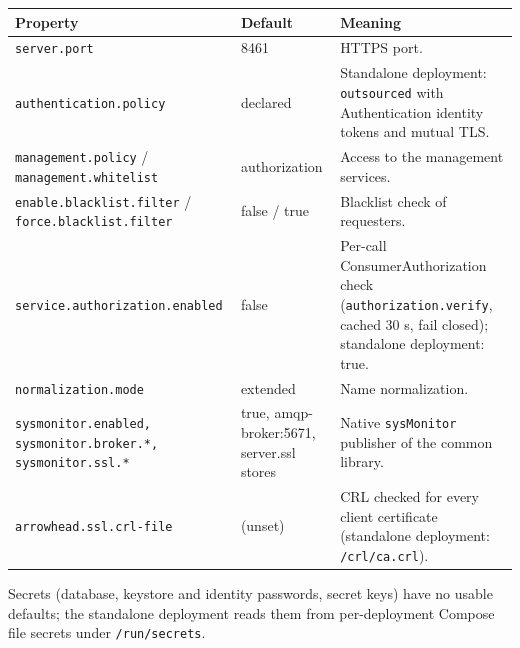 \documentclass[a4paper]{arrowhead}
\begin{document}
\noindent\begin{longtable}{| p{5.4cm} | p{3.4cm} | p{6.4cm} |} \hline
\rowcolor{gray!33} Property & Default & Meaning \\ \hline \endhead
\texttt{server.\allowbreak{}port} & 8461 & HTTPS port. \\ \hline
\texttt{authentication.\allowbreak{}policy} & declared & Standalone deployment: \texttt{outsourced} with Authentication identity tokens and mutual TLS. \\ \hline
\texttt{management.\allowbreak{}policy} / \texttt{management.\allowbreak{}whitelist} & authorization & Access to the management services. \\ \hline
\texttt{enable.\allowbreak{}blacklist.\allowbreak{}filter} / \texttt{force.\allowbreak{}blacklist.\allowbreak{}filter} & false / true & Blacklist check of requesters. \\ \hline
\texttt{service.\allowbreak{}authorization.\allowbreak{}enabled} & false & Per-call Consumer\allowbreak{}Authorization check (\texttt{authorization.\allowbreak{}verify}, cached 30 s, fail closed); standalone deployment: true. \\ \hline
\texttt{normalization.\allowbreak{}mode} & extended & Name normalization. \\ \hline
\texttt{sysmonitor.\allowbreak{}enabled,\allowbreak{} sysmonitor.\allowbreak{}broker.\allowbreak{}*,\allowbreak{} sysmonitor.\allowbreak{}ssl.\allowbreak{}*} & true, amqp-broker:5671, server.ssl stores & Native \texttt{sysMonitor} publisher of the common library. \\ \hline
\texttt{arrowhead.\allowbreak{}ssl.\allowbreak{}crl-\allowbreak{}file} & (unset) & CRL checked for every client certificate (standalone deployment: \texttt{/\allowbreak{}crl/\allowbreak{}ca.\allowbreak{}crl}). \\ \hline
\end{longtable}

Secrets (database, keystore and identity passwords, secret keys) have no usable defaults; the standalone deployment reads them from per-deployment Compose file secrets under \texttt{/\allowbreak{}run/\allowbreak{}secrets}.
\end{document}
